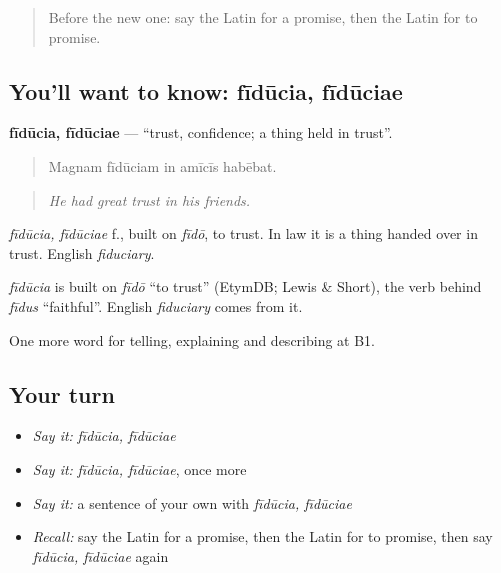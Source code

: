 \label{lesson:LA-C396-fiducia}



\begin{quote}
Before the new one: say the Latin for a promise, then the Latin for to promise.
\end{quote}

\subsection*{You'll want to know: fīdūcia, fīdūciae}
\textbf{fīdūcia, fīdūciae} — \textquotedblleft{}trust, confidence; a thing held in trust\textquotedblright{}.

\begin{quote}
Magnam fīdūciam in amīcīs habēbat.
\end{quote}

\begin{quote}
\emph{He had great trust in his friends.}
\end{quote}

\emph{fīdūcia, fīdūciae} f., built on \emph{fīdō}, to trust. In law it is a thing handed over in trust. English \emph{fiduciary}.

\begin{cousinweb}
\emph{fīdūcia} is built on \emph{fīdō} \textquotedblleft{}to trust\textquotedblright{} (EtymDB; Lewis \& Short), the verb behind \emph{fīdus} \textquotedblleft{}faithful\textquotedblright{}. English \emph{fiduciary} comes from it.
\end{cousinweb}

\begin{grammarlens}[title={What you've built}]
One more word for telling, explaining and describing at B1.
\end{grammarlens}

\subsection*{Your turn}
\begin{itemize}
\raggedright
  \item \emph{Say it:} \emph{fīdūcia, fīdūciae}
  \item \emph{Say it:} \emph{fīdūcia, fīdūciae}, once more
  \item \emph{Say it:} a sentence of your own with \emph{fīdūcia, fīdūciae}
  \item \emph{Recall:} say the Latin for a promise, then the Latin for to promise, then say \emph{fīdūcia, fīdūciae} again
\end{itemize}

